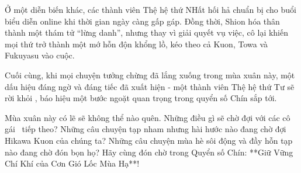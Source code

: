 \documentclass[main.tex]{subfiles}
\begin{document}
Ở một diễn biến khác, các thành viên Thệ hệ thứ NHất hối hả chuẩn bị cho buổi biểu diễn online khi thời gian ngày càng gấp gáp. Đồng thời, Shion hóa thân thành một thám tử ``lừng danh'', nhưng thay vì giải quyết vụ việc, cô lại khiến mọi thứ trở thành một mớ hỗn độn khổng lồ, kéo theo cả Kuon, Towa và Fukuyasu vào cuộc.

Cuối cùng, khi mọi chuyện tưởng chừng đã lắng xuống trong mùa xuân này, một dấu hiệu đáng ngờ và đáng tiếc đã xuất hiện - một thành viên Thệ hệ thứ Tư sẽ rời khỏi \hll, báo hiệu một bước ngoặt quan trọng trong quyển số Chín sắp tới.

Mùa xuân này có lẽ sẽ không thể nào quên. Những điều gì sẽ chờ đợi với các cô gái \hll\ tiếp theo? Những câu chuyện tạp nham nhưng hài hước nào đang chờ đợi Hikawa Kuon của chúng ta? Những câu chuyện mùa hè sôi động và đầy hỗn tạp nào đang chờ đón bọn họ? Hãy cùng đón chờ trong Quyển số Chín: **Giữ Vững Chí Khí của Cơn Gió Lốc Mùa Hạ**!
\end{document}
